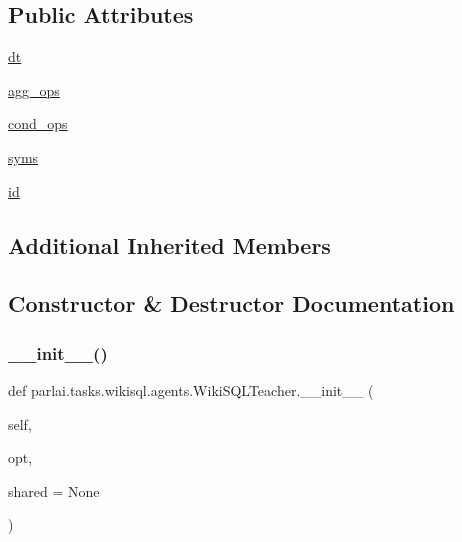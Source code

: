 \subsection*{Public Attributes}
\begin{DoxyCompactItemize}
\item 
\hyperlink{classparlai_1_1tasks_1_1wikisql_1_1agents_1_1WikiSQLTeacher_a343d704bea4fc5c096000b73b2796e03}{dt}
\item 
\hyperlink{classparlai_1_1tasks_1_1wikisql_1_1agents_1_1WikiSQLTeacher_acac9910a97f5b0ee9af7e9bd8a7e2d78}{agg\+\_\+ops}
\item 
\hyperlink{classparlai_1_1tasks_1_1wikisql_1_1agents_1_1WikiSQLTeacher_a8d6572adccf79dd778ec80ec14647980}{cond\+\_\+ops}
\item 
\hyperlink{classparlai_1_1tasks_1_1wikisql_1_1agents_1_1WikiSQLTeacher_a1a67c761791a412586131dd7dd595a7c}{syms}
\item 
\hyperlink{classparlai_1_1tasks_1_1wikisql_1_1agents_1_1WikiSQLTeacher_aec62053f23dd71f7db3997534f631136}{id}
\end{DoxyCompactItemize}
\subsection*{Additional Inherited Members}


\subsection{Constructor \& Destructor Documentation}
\mbox{\label{classparlai_1_1tasks_1_1wikisql_1_1agents_1_1WikiSQLTeacher_afabbebdbb464879554723b2b3af62493}} 
\subsubsection{\texorpdfstring{\+\_\+\+\_\+init\+\_\+\+\_\+()}{\_\_init\_\_()}}
{\footnotesize\ttfamily def parlai.\+tasks.\+wikisql.\+agents.\+Wiki\+S\+Q\+L\+Teacher.\+\_\+\+\_\+init\+\_\+\+\_\+ (\begin{DoxyParamCaption}\item[{}]{self,  }\item[{}]{opt,  }\item[{}]{shared = {\ttfamily None} }\end{DoxyParamCaption})}



